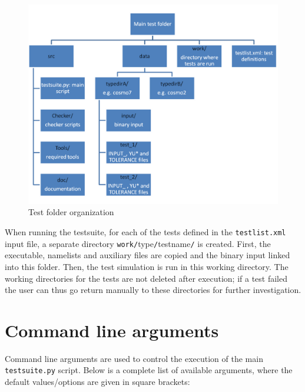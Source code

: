 \documentclass[12pt,twoside,a4paper]{report}
\begin{document}
\begin{figure}[hbt]
\begin{center}
\includegraphics[width=0.7\linewidth]{fig_structure}%
\caption{Test folder organization \label{fig:structure}}
\end{center}
\end{figure}

When running the testsuite, for each of the tests defined in the \texttt{testlist.xml} input file, a separate directory \texttt{work/}type\texttt{/}testname\texttt{/} is created. First, the executable, namelists and auxiliary files are copied and the binary input linked into this folder. Then, the test simulation is run in this working directory. The working directories for the tests are not deleted after execution; if a test failed the user can thus go return manually to these directories for further investigation.

\newpage
\section{Command line arguments}

Command line arguments are used to control the execution of the main \texttt{testsuite.py} script. Below is a complete list of available arguments, where the default values/options are given in square brackets:\\
\end{document}
